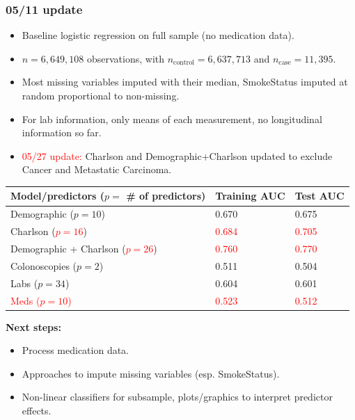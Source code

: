 \documentclass[12pt]{article}
\newcommand{\note}[1]{\textcolor{red}{#1}}
\begin{document}
\pagebreak

\subsubsection*{05/11 update}
\begin{itemize}
  \item Baseline logistic regression on full sample (no medication data).
  \item $n = 6,649,108$ observations, with $n_{\text{control}} = 6,637,713$ and $n_{\text{case}} = 11,395$.
  \item Most missing variables imputed with their median, SmokeStatus imputed at random proportional to non-missing.
  \item For lab information, only means of each measurement, no longitudinal information so far.
  \item \note{05/27 update:} Charlson and Demographic+Charlson updated to exclude Cancer and Metastatic Carcinoma.
\end{itemize}
\begin{center}
\begin{tabular}{|l|l|l|}
\hline
\textbf{Model/predictors ($p=$ \# of predictors)} & \textbf{Training AUC} & \textbf{Test AUC} \\ \hline
Demographic ($p=10$) & 0.670 & 0.675 \\ \hline
Charlson (\note{$p=16$}) & \note{0.684} & \note{0.705} \\ \hline
Demographic + Charlson (\note{$p=26$})                                                 & \note{0.760}               & \note{0.770}     \\ \hline
Colonoscopies ($p=2$) & 0.511 & 0.504 \\ \hline
Labs ($p=34$) & 0.604 & 0.601 \\ \hline
\note{Meds ($p=10$)} & \note{0.523} & \note{0.512} \\ \hline
\end{tabular}
\end{center}
{\bf Next steps:}
\begin{itemize}
  \item Process medication data.
  \item Approaches to impute missing variables (esp. SmokeStatus).
  \item Non-linear classifiers for subsample, plots/graphics to interpret predictor effects.
\end{itemize}
\end{document}
